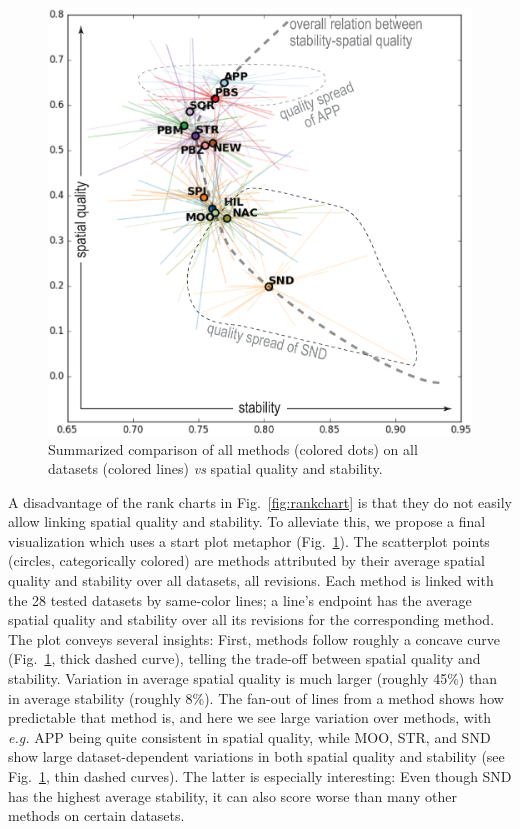 \begin{figure}[htbp!]
\centering
\includegraphics[width=.8\linewidth]{figures/initial-treemap-evaluation/starplot.eps}
\vspace{-0.1cm}
\caption{Summarized comparison of all methods (colored dots) on all datasets (colored lines) \emph{vs} spatial quality and stability.}
\vspace{-0.2cm}
\label{fig:starplot}
\end{figure}

A disadvantage of the rank charts in Fig.~\ref{fig:rankchart} is that they do not easily allow linking spatial quality and stability. To alleviate this, we propose a final visualization which uses a start plot metaphor (Fig.~\ref{fig:starplot}). The scatterplot points (circles, categorically colored) are methods attributed by their average spatial quality and stability over all datasets, all revisions. Each method is linked with the 28 tested datasets by same-color lines; a line's endpoint has the average spatial quality and stability over all its revisions for the corresponding method. The plot conveys several insights: First, methods follow roughly a concave curve (Fig.~\ref{fig:starplot}, thick dashed curve), telling the trade-off between spatial quality and stability. Variation in average spatial quality is much larger (roughly 45\%) than in average stability (roughly 8\%). The fan-out of lines from a method shows how predictable that method is, and here we see large variation over methods, with \emph{e.g.} APP being quite consistent in spatial quality, while MOO, STR, and SND show large dataset-dependent variations in both spatial quality and stability (see Fig.~\ref{fig:starplot}, thin dashed curves). The latter is especially interesting: Even though SND has the highest average stability, it can also score worse than many other methods on certain datasets.

